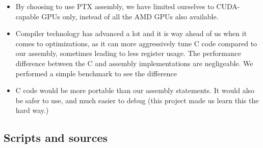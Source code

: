 \documentclass[10pt, a4paper]{report}
\begin{document}
\begin{itemize}
\item By choosing to use PTX assembly, we have limited ourselves to CUDA-capable
GPUs only, instead of all the AMD GPUs also available.
\item Compiler technology has advanced a lot and it is way ahead of us when it
comes to optimizations, as it can more aggressively tune C code compared to
our assembly, sometimes leading to less register usage.
The performance difference between the C and assembly implementations are
negligeable.
We performed a simple benchmark to see the difference
\item C code would be more portable than our assembly statements.
It would also be safer to use, and much easier to debug (this project made us
learn this the hard way.)
\end{itemize}

\subsection{Scripts and sources}

%
%
%
\end{document}

